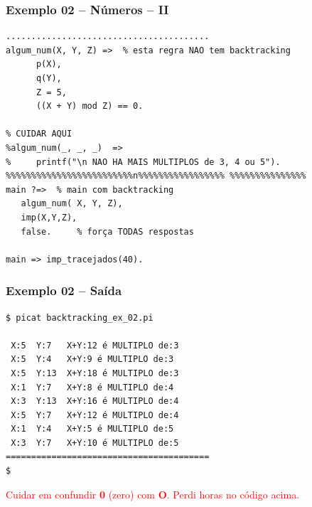 \begin{frame}[fragile]
\frametitle{Exemplo 02 -- Números -- II}

\begin{scriptsize}
\begin{verbatim}
........................................
algum_num(X, Y, Z) =>  % esta regra NAO tem backtracking
      p(X),
      q(Y),
      Z = 5,
      ((X + Y) mod Z) == 0.

% CUIDAR AQUI
%algum_num(_, _, _)  =>     
%     printf("\n NAO HA MAIS MULTIPLOS de 3, 4 ou 5").    
%%%%%%%%%%%%%%%%%%%%%%%%%n%%%%%%%%%%%%%%%%% %%%%%%%%%%%%%%%
main ?=>  % main com backtracking
   algum_num( X, Y, Z),
   imp(X,Y,Z),
   false.     % força TODAS respostas 
   
main => imp_tracejados(40).   
 \end{verbatim} 
 
 \end{scriptsize}
\end{frame}

\begin{frame}[fragile]
\frametitle{Exemplo 02 -- Saída}

\begin{scriptsize}
\begin{verbatim}
$ picat backtracking_ex_02.pi 

 X:5  Y:7 	X+Y:12 é MULTIPLO de:3
 X:5  Y:4 	X+Y:9 é MULTIPLO de:3
 X:5  Y:13 	X+Y:18 é MULTIPLO de:3
 X:1  Y:7 	X+Y:8 é MULTIPLO de:4
 X:3  Y:13 	X+Y:16 é MULTIPLO de:4
 X:5  Y:7 	X+Y:12 é MULTIPLO de:4
 X:1  Y:4 	X+Y:5 é MULTIPLO de:5
 X:3  Y:7 	X+Y:10 é MULTIPLO de:5
========================================
$ 
\end{verbatim} 
  \end{scriptsize}   
  
\textcolor{red}{Cuidar em confundir \textbf{0} (zero) com \textbf{O}. Perdi horas no código acima.}  
\end{frame}








